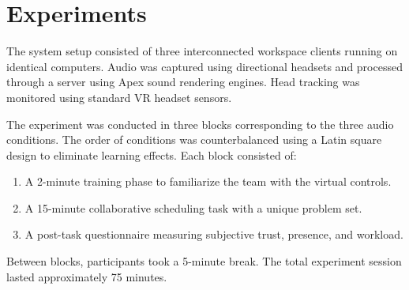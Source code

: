 \section{Experiments}
The system setup consisted of three interconnected workspace clients running on identical computers. Audio was captured using directional headsets and processed through a server using Apex sound rendering engines. Head tracking was monitored using standard VR headset sensors.

The experiment was conducted in three blocks corresponding to the three audio conditions. The order of conditions was counterbalanced using a Latin square design to eliminate learning effects. Each block consisted of:
\begin{enumerate}
\item A 2-minute training phase to familiarize the team with the virtual controls.
\item A 15-minute collaborative scheduling task with a unique problem set.
\item A post-task questionnaire measuring subjective trust, presence, and workload.
\end{enumerate}
Between blocks, participants took a 5-minute break. The total experiment session lasted approximately 75 minutes.
